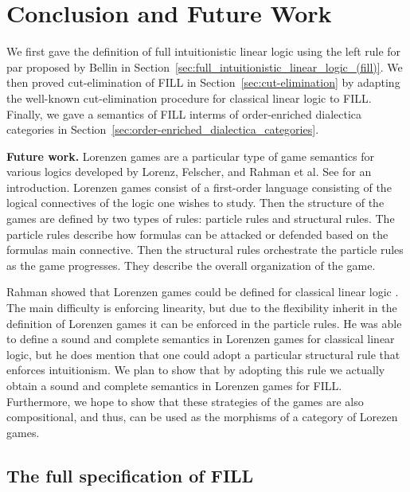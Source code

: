 


\section{Conclusion and Future Work}
\label{sec:conclusion_and_future_work}

We first gave the definition of full intuitionistic linear logic using
the left rule for par proposed by Bellin in
Section~\ref{sec:full_intuitionistic_linear_logic_(fill)}.  We then
proved cut-elimination of FILL in Section~\ref{sec:cut-elimination} by
adapting the well-known cut-elimination procedure for classical linear
logic to FILL.  Finally, we gave a semantics of FILL interms of
order-enriched dialectica categories in
Section~\ref{sec:order-enriched_dialectica_categories}.

\textbf{Future work.} Lorenzen games are a particular type of game
semantics for various logics developed by Lorenz, Felscher, and Rahman
et al. See \cite{Keiff:2011,Rahman:2005} for an introduction.
Lorenzen games consist of a first-order language consisting of the
logical connectives of the logic one wishes to study.  Then the
structure of the games are defined by two types of rules: particle
rules and structural rules.  The particle rules describe how formulas
can be attacked or defended based on the formulas main connective.
Then the structural rules orchestrate the particle rules as the game
progresses.  They describe the overall organization of the game.

Rahman showed that Lorenzen games could be defined for classical
linear logic \cite{Rahman:2002}.  The main difficulty is enforcing
linearity, but due to the flexibility inherit in the definition of
Lorenzen games it can be enforced in the particle rules.  He was able
to define a sound and complete semantics in Lorenzen games for
classical linear logic, but he does mention that one could adopt a
particular structural rule that enforces intuitionism.  We plan to
show that by adopting this rule we actually obtain a sound and
complete semantics in Lorenzen games for FILL.  Furthermore, we hope
to show that these strategies of the games are also compositional, and
thus, can be used as the morphisms of a category of Lorezen games.





\appendix

\begin{report}
  \section{The full specification of FILL}
\label{sec:fill_specification}
\FILLall{}
\end{report}


